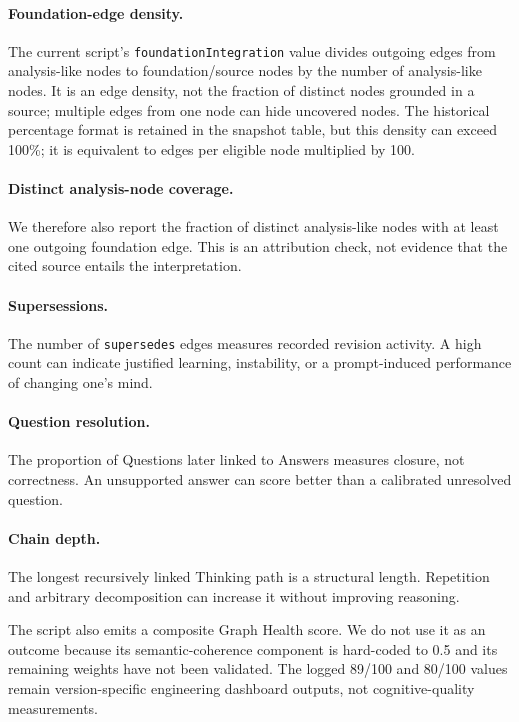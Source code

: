 \paragraph{Foundation-edge density.} The current script's
\texttt{foundationIntegration} value divides outgoing edges from analysis-like
nodes to foundation/source nodes by the number of analysis-like nodes. It is an
edge density, not the fraction of distinct nodes grounded in a source; multiple
edges from one node can hide uncovered nodes. The historical percentage
format is retained in the snapshot table, but this density can exceed 100\%;
it is equivalent to edges per eligible node multiplied by 100.

\paragraph{Distinct analysis-node coverage.} We therefore also report the
fraction of distinct analysis-like nodes with at least one outgoing foundation
edge. This is an attribution check, not evidence that the cited source entails
the interpretation.

\paragraph{Supersessions.} The number of \texttt{supersedes} edges measures
recorded revision activity. A high count can indicate justified learning,
instability, or a prompt-induced performance of changing one's mind.

\paragraph{Question resolution.} The proportion of Questions later linked to
Answers measures closure, not correctness. An unsupported answer can score
better than a calibrated unresolved question.

\paragraph{Chain depth.} The longest recursively linked Thinking path is a
structural length. Repetition and arbitrary decomposition can increase it
without improving reasoning.

The script also emits a composite Graph Health score. We do not use it as an
outcome because its semantic-coherence component is hard-coded to 0.5 and its
remaining weights have not been validated. The logged 89/100 and 80/100 values
remain version-specific engineering dashboard outputs, not cognitive-quality
measurements.

